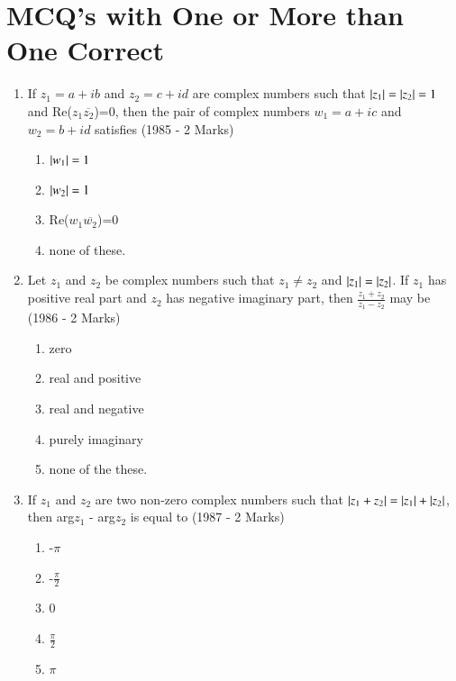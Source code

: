 \documentclass[journal,12pt,twocolumn]{IEEEtran}
\theoremstyle{remark}
\begin{document}
\section{ MCQ's with One or More than One Correct}
\begin{enumerate}
	\item If $z_{1}=a+ib$ and $z_{2}=c+id$ are complex numbers such that $\left\vert z_{1}\right\vert=\left\vert z_{2}\right\vert=1$ and Re($z_{1}\overline{z_{2}}$)=0, then the pair of complex numbers $w_{1}=a+ic$ and $w_{2}=b+id$ satisfies \hfill{(1985 - 2 Marks)}
		\begin{multicols}{2}
\begin{enumerate}
	\item $\left\vert w_{1}\right\vert=1$
	\item $\left\vert w_{2}\right\vert=1$
	\item Re($w_{1}\overline{w_{2}}$)=0
	\item none of these.
\end{enumerate}
		\end{multicols}

\item Let $z_{1}$ and $z_{2}$ be complex numbers such that $z_{1}\neq z_{2}$ and $\left\vert z_{1}\right\vert=\left\vert z_{2}\right\vert$. If $z_{1}$ has positive real part and $z_{2}$ has negative imaginary part, then $\frac{z_{1}+z_{2}}{z_{1}-z_{2}}$ may be \hfill{(1986 - 2 Marks)}
	\begin{multicols}{2}
\begin{enumerate}
	\item zero
	\item real and positive
	\item real and negative
	\item purely imaginary
	\item none of the these.
\end{enumerate}
	\end{multicols}

\item If $z_{1}$ and $z_{2}$ are two non-zero complex numbers such that $\left\vert z_{1}+z_{2}\right\vert=\left\vert z_{1}\right\vert+\left\vert z_{2}\right\vert$, then arg$z_{1}$ - arg$z_{2}$ is equal to \hfill{(1987 - 2 Marks)}
	\begin{multicols}{4}
\begin{enumerate}
	\item -$\pi$
	\item -$\frac{\pi}{2}$
        \item 0
        \item $\frac{\pi}{2}$
	\item $\pi$
\end{enumerate}
	\end{multicols}


\end{enumerate}
\end{document}
